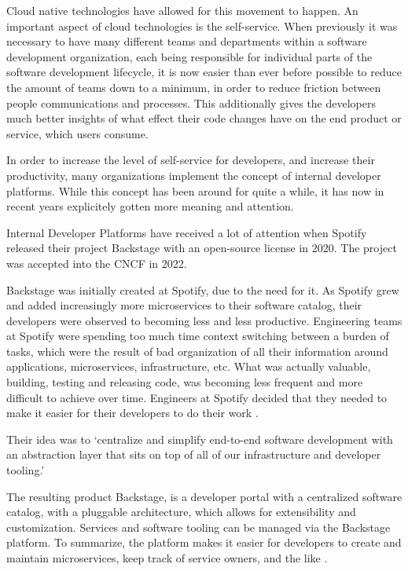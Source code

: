 Cloud native technologies have allowed for this movement to happen.
An important aspect of cloud technologies is the self-service.
When previously it was necessary to have many different teams and departments
within a software development organization,
each being responsible for individual parts of the 
software development lifecycle,
it is now easier than ever before possible to reduce the amount of
teams down to a minimum, in order to reduce friction between people communications and processes.
This additionally gives the developers much better insights of what effect their code changes have
on the end product or service, which users consume.

In order to increase the level of self-service for developers,
and increase their productivity,
many organizations implement the concept of internal developer platforms.
While this concept has been around for quite a while,
it has now in recent years explicitely gotten more meaning and attention.

Internal Developer Platforms have received a lot of attention
when Spotify released their project Backstage
\autocite{backstageIOWebsite}
with an open-source license in 2020. The project was accepted into the CNCF in 2022.

%
Backstage was initially created at Spotify, due to the need for it.
As Spotify grew and added increasingly more microservices to their software catalog,
their developers were observed to becoming less and less productive.
Engineering teams at Spotify were spending too much time context switching between
a burden of tasks, which were the result of bad organization of all their
information around applications, microservices, infrastructure, etc.
What was actually valuable, building, testing and releasing code,
was becoming less frequent and more difficult to achieve over time.
Engineers at Spotify decided that they needed to make it easier 
for their developers to do their work
\autocite{backstageSpotifyStory}.

Their idea was to
\enquote*{centralize and simplify end-to-end software development
with an abstraction layer that sits on top of all of our infrastructure and developer tooling.}
\autocite{backstageSpotifyStory}

The resulting product Backstage,
is a developer portal with a centralized software catalog,
with a pluggable architecture,
which allows for extensibility and customization.
Services and software tooling can be managed via the Backstage platform.
To summarize, the platform makes it easier for developers to create and maintain
microservices, keep track of service owners, and the like
\autocite{backstageSpotifyStory}.

